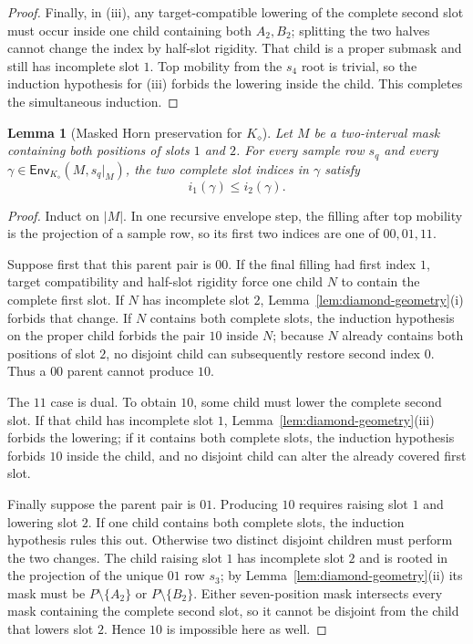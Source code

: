 \documentclass[11pt]{article}
\newtheorem{lemma}[definition]{Lemma}
\newcommand{\Env}{\mathsf{Env}}
\begin{document}
\begin{proof}
Finally, in \textup{(iii)}, any target-compatible lowering of the complete
second slot must occur inside one child containing both $A_2,B_2$; splitting
the two halves cannot change the index by half-slot rigidity.  That child is a
proper submask and still has incomplete slot $1$.  Top mobility from the
$s_4$ root is trivial, so the induction hypothesis for \textup{(iii)} forbids
the lowering inside the child.  This completes the simultaneous induction.
\end{proof}

\begin{lemma}[Masked Horn preservation for $K_{\diamond}$]
\label{lem:diamond-masked-horn}
Let $M$ be a two-interval mask containing both positions of slots $1$ and $2$.
For every sample row $s_q$ and every
\(
\gamma\in\Env_{K_{\diamond}}(M,s_q|_M)
\), the two complete slot indices in $\gamma$ satisfy
\[
  i_1(\gamma)\le i_2(\gamma).
\]
\end{lemma}

\begin{proof}
Induct on $|M|$.  In one recursive envelope step, the filling after top
mobility is the projection of a sample row, so its first two indices are one of
$00,01,11$.

Suppose first that this parent pair is $00$.  If the final filling had first
index $1$, target compatibility and half-slot rigidity force one child $N$ to
contain the complete first slot.  If $N$ has incomplete slot $2$,
Lemma~\ref{lem:diamond-geometry}\textup{(i)} forbids that change.  If $N$
contains both complete slots, the induction hypothesis on the proper child
forbids the pair $10$ inside $N$; because $N$ already contains both positions
of slot $2$, no disjoint child can subsequently restore second index $0$.
Thus a $00$ parent cannot produce $10$.

The $11$ case is dual.  To obtain $10$, some child must lower the complete
second slot.  If that child has incomplete slot $1$,
Lemma~\ref{lem:diamond-geometry}\textup{(iii)} forbids the lowering; if it
contains both complete slots, the induction hypothesis forbids $10$ inside the
child, and no disjoint child can alter the already covered first slot.

Finally suppose the parent pair is $01$.  Producing $10$ requires raising
slot $1$ and lowering slot $2$.  If one child contains both complete slots,
the induction hypothesis rules this out.  Otherwise two distinct disjoint
children must perform the two changes.  The child raising slot $1$ has
incomplete slot $2$ and is rooted in the projection of the unique $01$ row
$s_3$; by Lemma~\ref{lem:diamond-geometry}\textup{(ii)} its mask must be
$P\setminus\{A_2\}$ or $P\setminus\{B_2\}$.  Either seven-position mask
intersects every mask containing the complete second slot, so it cannot be
disjoint from the child that lowers slot $2$.  Hence $10$ is impossible here
as well.
\end{proof}
\end{document}

